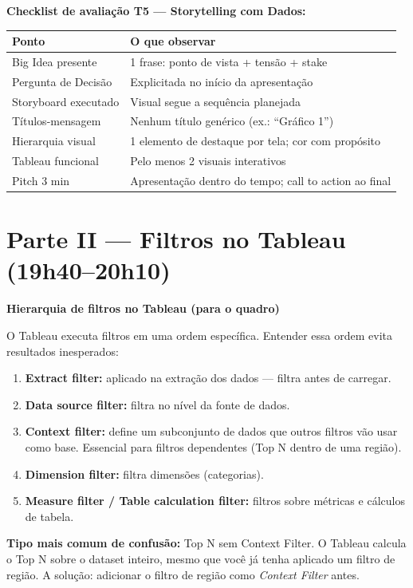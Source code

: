 \begin{BoardBox}
\textbf{Checklist de avaliação T5 — Storytelling com Dados:}
\begin{tabular}{|p{4.5cm}|p{8.5cm}|}
\hline
\textbf{Ponto} & \textbf{O que observar} \\
\hline
Big Idea presente & 1 frase: ponto de vista + tensão + stake \\
Pergunta de Decisão & Explicitada no início da apresentação \\
Storyboard executado & Visual segue a sequência planejada \\
Títulos-mensagem & Nenhum título genérico (ex.: ``Gráfico 1'') \\
Hierarquia visual & 1 elemento de destaque por tela; cor com propósito \\
Tableau funcional & Pelo menos 2 visuais interativos \\
Pitch 3 min & Apresentação dentro do tempo; call to action ao final \\
\hline
\end{tabular}
\end{BoardBox}

\section{Parte II — Filtros no Tableau (19h40–20h10)}

\begin{BoardBox}
\textbf{Hierarquia de filtros no Tableau (para o quadro)}

O Tableau executa filtros em uma ordem específica. Entender essa ordem
evita resultados inesperados:

\begin{enumerate}
  \item \textbf{Extract filter:} aplicado na extração dos dados — filtra antes de carregar.
  \item \textbf{Data source filter:} filtra no nível da fonte de dados.
  \item \textbf{Context filter:} define um subconjunto de dados que outros filtros
  vão usar como base. Essencial para filtros dependentes (Top N dentro de uma região).
  \item \textbf{Dimension filter:} filtra dimensões (categorias).
  \item \textbf{Measure filter / Table calculation filter:} filtros sobre métricas
  e cálculos de tabela.
\end{enumerate}

\textbf{Tipo mais comum de confusão:} Top N sem Context Filter.
O Tableau calcula o Top N sobre o dataset inteiro, mesmo que você já tenha
aplicado um filtro de região. A solução: adicionar o filtro de região como
\emph{Context Filter} antes.
\end{BoardBox}

